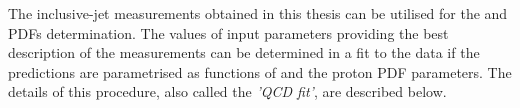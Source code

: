 The inclusive-jet measurements obtained in this thesis can be utilised for the \as and PDFs determination. The values of input parameters providing the best description of the measurements can be determined in a fit to the data if the predictions are parametrised as functions of \asz and the proton PDF parameters. The details of this procedure, also called the \emph{'QCD fit'}, are described below.



